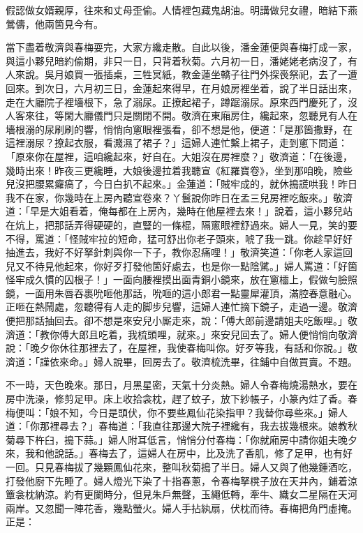 \begin{myquote}
假認做女婿親厚，往來和丈母歪偷。人情裡包藏鬼胡油。明講做兒女禮，暗結下燕鶯儔，他兩箇見今有。
\end{myquote}

當下盡着敬濟與春梅耍完，大家方纔走散。自此以後，潘金蓮便與春梅打成一家，與這小夥兒暗約偷期，非只一日，只背着秋菊。六月初一日，潘姥姥老病沒了，有人來說。吳月娘買一張插桌，三牲冥紙，教金蓮坐轎子往門外探䘮祭祀，去了一遭回來。到次日，六月初三日，金蓮起來得早，在月娘房裡坐着，說了半日話出來，走在大廳院子裡墻根下，急了溺尿。正撩起裙子，蹲踞溺尿。原來西門慶死了，沒人客來往，等閑大廳儀門只是關閉不開。敬濟在東廂房住，纔起來，忽聽見有人在墻根溺的尿刷刷的響，悄悄向窻眼裡張看，卻不想是他，便道：「是那箇撒野，在這裡溺尿？撩起衣服，看濺濕了裙子？」這婦人連忙繫上裙子，走到窻下問道：「原來你在屋裡，這咱纔起來，好自在。大姐沒在房裡麼？」敬濟道：「在後邊，幾時出來！昨夜三更纔睡，大娘後邊拉着我聽宣《紅羅寶卷》，坐到那咱晚，險些兒沒把腰累㿚瘑了，今日白扒不起來。」{}金蓮道：「賊牢成的，就休搗謊哄我！昨日我不在家，你幾時在上房內聽宣卷來？丫鬟說你昨日在孟三兒房裡吃飯來。」{}敬濟道：「早是大姐看着，俺每都在上房內，幾時在他屋裡去來！」說着，這小夥兒站在炕上，把那話弄得硬硬的，直豎的一條棍，隔窻眼裡舒過來。{}婦人一見，笑的要不得，{}罵道：「怪賊牢拉的短命，猛可舒出你老子頭來，唬了我一跳。你趁早好好抽進去，我好不好拏針刺與你一下子，教你忍痛哩！」敬濟笑道：「你老人家這回兒又不待見他起來，你好歹打發他箇好處去，也是你一點陰騭。」{}婦人罵道：「好箇怪牢成久慣的囚根子！」一面向腰裡摸出面青銅小鏡來，放在窻櫺上，假做勻臉照鏡，一面用朱唇吞裹吮咂他那話，{}吮咂的這小郎君一點靈犀灌頂，滿腔春意融心。正咂在熱鬧處，忽聽得有人走的脚步兒響，這婦人連忙摘下鏡子，走過一邊。敬濟便把那話抽回去。卻不想是來安兒小厮走來，說：「傅大郎前邊請姐夫吃飯哩。」敬濟道：「教你傅大郎且吃着，我梳頭哩，就來。」來安兒回去了。婦人便悄悄向敬濟說：「晚夕你休往那裡去了，在屋裡，我使春梅叫你。好歹等我，有話和你說。」敬濟道：「謹依來命。」婦人說畢，回房去了。敬濟梳洗畢，往鋪中自做買賣。不題。

不一時，天色晚來。那日，月黑星密，天氣十分炎熱。婦人令春梅燒湯熱水，要在房中洗澡，修剪足甲。床上收拾衾枕，趕了蚊子，放下紗帳子，小篆內炷了香。春梅便叫：「娘不知，今日是頭伏，你不要些鳳仙花染指甲？我替你尋些來。」{}婦人道：「你那裡尋去？」春梅道：「我直往那邊大院子裡纔有，我去拔幾根來。娘教秋菊尋下杵臼，搗下蒜。」婦人附耳低言，悄悄分付春梅：「你就廂房中請你姐夫晚夕來，我和他說話。」春梅去了，這婦人在房中，比及洗了香肌，修了足甲，也有好一回。只見春梅拔了幾顆鳳仙花來，整叫秋菊搗了半日。婦人又與了他幾鍾酒吃，打發他廚下先睡了。婦人燈光下染了十指春蔥，令春梅拏櫈子放在天井內，鋪着涼簟衾枕納涼。約有更闌時分，但見朱戶無聲，玉繩低轉，牽牛、織女二星隔在天河兩岸。又忽聞一陣花香，幾點螢火。婦人手拈紈扇，伏枕而待。春梅把角門虛掩。正是：

